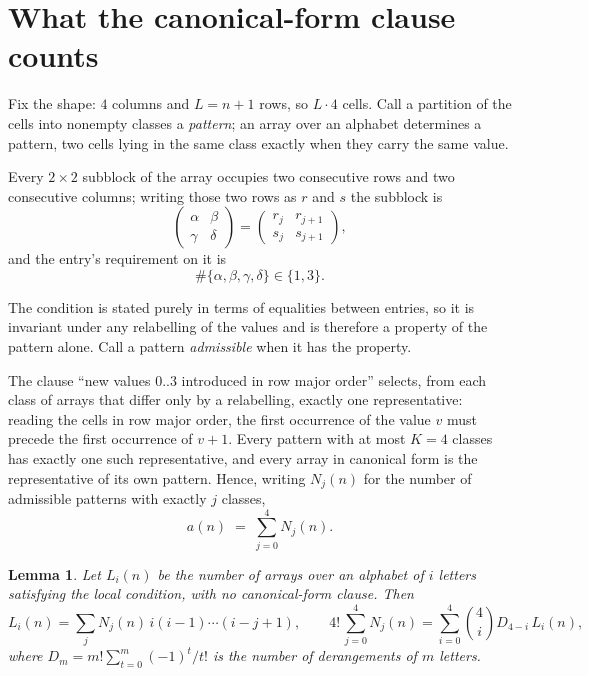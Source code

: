 \documentclass[11pt,a4paper]{article}
\theoremstyle{plain}
\newtheorem{lemma}[theorem]{Lemma}
\theoremstyle{definition}
\begin{document}
\section{What the canonical-form clause counts}

Fix the shape: $4$ columns and $L=n+1$ rows, so $L\cdot4$ cells. Call a
partition of the cells into nonempty classes a \emph{pattern}; an array over an alphabet
determines a pattern, two cells lying in the same class exactly when they carry the same
value.

Every $2\times2$ subblock of the array occupies two consecutive
rows and two consecutive columns; writing those two rows as $r$ and $s$ the
subblock is
\[
\begin{pmatrix}\alpha&\beta\\\gamma&\delta\end{pmatrix}=\begin{pmatrix}r_j&r_{j+1}\\s_j&s_{j+1}\end{pmatrix},
\]
and the entry's requirement on it is
\begin{equation}\label{eq:loc}
\#\{\alpha,\beta,\gamma,\delta\}\in\{1,3\}.
\end{equation}

The condition is stated purely in terms of equalities between entries, so it is invariant
under any relabelling of the values and is therefore a property of the pattern alone. Call a
pattern \emph{admissible} when it has the property.

The clause ``new values $0..3$ introduced in row major order'' selects, from each class
of arrays that differ only by a relabelling, exactly one representative: reading the cells in
row major order, the first occurrence of the value $v$ must precede the first occurrence of
$v+1$. Every pattern with at most $K=4$ classes has exactly one such representative, and
every array in canonical form is the representative of its own pattern. Hence, writing
$N_j(n)$ for the number of admissible patterns with exactly $j$ classes,
\begin{equation}\label{eq:apat}
a(n)\;=\;\sum_{j=0}^{4}N_j(n).
\end{equation}

\begin{lemma}\label{lem:inv}
Let $L_i(n)$ be the number of arrays over an alphabet of $i$ letters satisfying the local
condition, with no canonical-form clause. Then
\[
L_i(n)=\sum_j N_j(n)\,i(i-1)\cdots(i-j+1),
\qquad
4!\,\sum_{j=0}^{4}N_j(n)=\sum_{i=0}^{4}\binom{4}{i}D_{4-i}\,L_i(n),
\]
where $D_m=m!\sum_{t=0}^{m}(-1)^t/t!$ is the number of derangements of $m$ letters.
\end{lemma}
\end{document}
